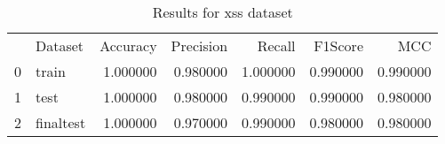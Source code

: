 \begin{table}
\caption{Results for xss dataset}
\begin{tabular}{llrrrrr}
 & Dataset & Accuracy & Precision & Recall & F1Score & MCC \\
0 & train & 1.000000 & 0.980000 & 1.000000 & 0.990000 & 0.990000 \\
1 & test & 1.000000 & 0.980000 & 0.990000 & 0.990000 & 0.980000 \\
2 & finaltest & 1.000000 & 0.970000 & 0.990000 & 0.980000 & 0.980000 \\
\end{tabular}
\end{table}
